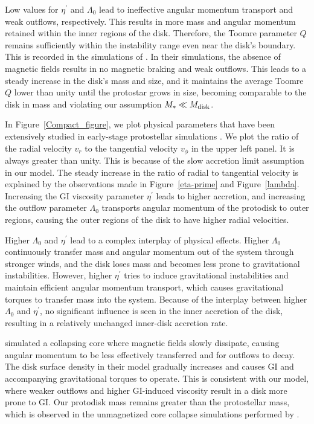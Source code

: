 \documentclass[twocolumn,linenumbers]{aastex631}
\begin{document}
Low values for $\eta^{\prime}$ and $\Lambda_0$ lead to ineffective angular momentum transport and weak outflows, respectively. This results in more mass and angular momentum retained within the inner regions of the disk.
Therefore, the Toomre parameter $Q$ remains sufficiently within the instability range even near the disk's boundary. This is recorded in the simulations of \cite{machida2010formation}. In their simulations, the absence of magnetic fields results in no magnetic braking and weak outflows. This leads to a steady increase in the disk's mass and size, and it maintains the average Toomre $Q$ lower than unity until the protostar grows in size, becoming comparable to the disk in mass and violating our assumption $M_* \ll M_{\rm disk}$.

In Figure~\ref{Compact_figure}, we plot physical parameters that have been extensively studied in early-stage protostellar simulations \citep{machida2010formation,machida2011effect,machida2019first}. We plot the ratio of the radial velocity $v_r$ to the tangential velocity $v_\phi$ in the upper left panel. 
It is always greater than unity. This is because of the slow accretion limit assumption in our model. The steady increase in the ratio of radial to tangential velocity is explained by the observations made in Figure~\ref{eta-prime} and Figure~\ref{lambda}. Increasing the GI viscosity parameter $\eta^{\prime}$ leads to higher accretion, and increasing the outflow parameter $\Lambda_0$ transports angular momentum of the protodisk to outer regions, causing the outer regions of the disk to have higher radial velocities.

Higher $\Lambda_0$ and $\eta^{\prime}$ lead to a complex interplay of physical effects. Higher $\Lambda_0$ continuously transfer mass and angular momentum out of the system through stronger winds, and the disk loses mass and becomes less prone to gravitational instabilities. However, higher $\eta^{\prime}$ tries to induce gravitational instabilities and maintain efficient angular momentum transport, which causes gravitational torques to transfer mass into the system. Because of the interplay between higher $\Lambda_0$ and $\eta^{\prime}$, no significant influence is seen in the inner accretion of the disk, resulting in a relatively unchanged inner-disk accretion rate.

\cite{machida2019first} simulated a collapsing core where magnetic fields slowly dissipate, causing angular momentum to be less effectively transferred and for outflows to decay. The disk surface density in their model gradually increases and causes GI and accompanying gravitational torques to operate. This is consistent with our model, where weaker outflows and higher GI-induced viscosity result in a disk more prone to GI. Our protodisk mass remains greater than the protostellar mass, which is observed in the unmagnetized core collapse simulations performed by \citet{machida2010formation}.
\end{document}
